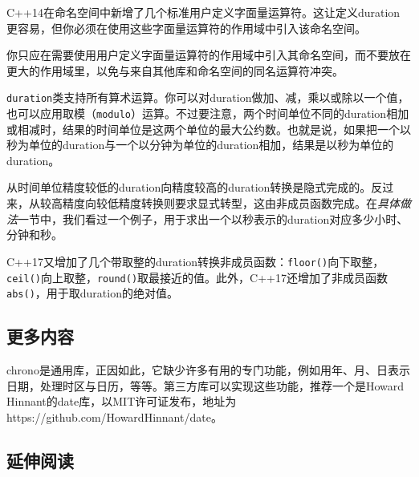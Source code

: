 
C++14在命名空间中新增了几个标准用户定义字面量运算符。这让定义duration更容易，但你必须在使用这些字面量运算符的作用域中引入该命名空间。



\begin{myNote}[tip]
你只应在需要使用用户定义字面量运算符的作用域中引入其命名空间，而不要放在更大的作用域里，以免与来自其他库和命名空间的同名运算符冲突。
\end{myNote}



\texttt{duration}类支持所有算术运算。你可以对duration做加、减，乘以或除以一个值，也可以应用取模（\texttt{modulo}）运算。不过要注意，两个时间单位不同的duration相加或相减时，结果的时间单位是这两个单位的最大公约数。也就是说，如果把一个以秒为单位的duration与一个以分钟为单位的duration相加，结果是以秒为单位的duration。



从时间单位精度较低的duration向精度较高的duration转换是隐式完成的。反过来，从较高精度向较低精度转换则要求显式转型，这由非成员函数完成。在\textit{具体做法}一节中，我们看过一个例子，用于求出一个以秒表示的duration对应多少小时、分钟和秒。



C++17又增加了几个带取整的duration转换非成员函数：\texttt{floor()}向下取整，\texttt{ceil()}向上取整，\texttt{round()}取最接近的值。此外，C++17还增加了非成员函数\texttt{abs()}，用于取duration的绝对值。



\subsection{更多内容}



chrono是通用库，正因如此，它缺少许多有用的专门功能，例如用年、月、日表示日期，处理时区与日历，等等。第三方库可以实现这些功能，推荐一个是Howard Hinnant的date库，以MIT许可证发布，地址为https://\allowbreak{}github.\allowbreak{}com/\allowbreak{}HowardHinnant/\allowbreak{}date。



\subsection{延伸阅读}


